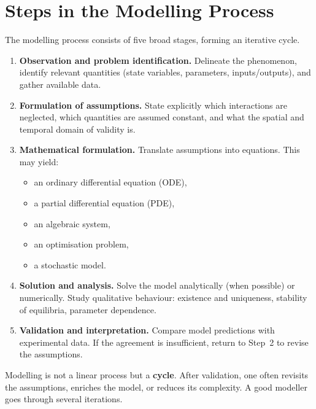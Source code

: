 \section{Steps in the Modelling Process}
\label{sec:steps}

The modelling process consists of five broad stages, forming an
iterative cycle.

\begin{enumerate}
  \item \textbf{Observation and problem identification.}
    Delineate the phenomenon, identify relevant quantities (state
    variables, parameters, inputs/outputs), and gather available data.

  \item \textbf{Formulation of assumptions.}
    State explicitly which interactions are neglected, which quantities
    are assumed constant, and what the spatial and temporal domain of
    validity is.

  \item \textbf{Mathematical formulation.}
    Translate assumptions into equations.  This may yield:
    \begin{itemize}
      \item an ordinary differential equation (ODE),
      \item a partial differential equation (PDE),
      \item an algebraic system,
      \item an optimisation problem,
      \item a stochastic model.
    \end{itemize}

  \item \textbf{Solution and analysis.}
    Solve the model analytically (when possible) or numerically.
    Study qualitative behaviour: existence and uniqueness, stability
    of equilibria, parameter dependence.

  \item \textbf{Validation and interpretation.}
    Compare model predictions with experimental data.  If the agreement
    is insufficient, return to Step~2 to revise the assumptions.
\end{enumerate}

\begin{intuition}[title=\textbf{The modelling cycle}]
Modelling is not a linear process but a \textbf{cycle}.  After
validation, one often revisits the assumptions, enriches the model,
or reduces its complexity.  A good modeller goes through several
iterations.
\end{intuition}


